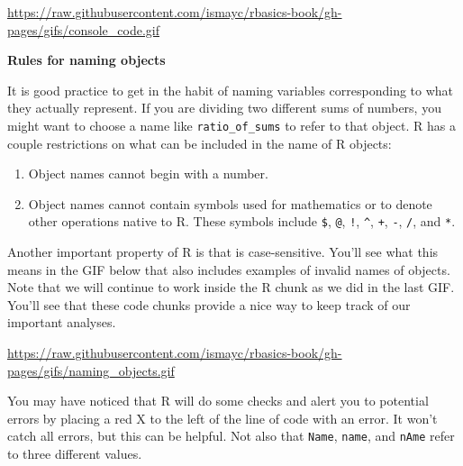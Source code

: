 \documentclass[]{tufte-book}
\providecommand{\tightlist}{%
  \setlength{\itemsep}{0pt}\setlength{\parskip}{0pt}}
\begin{document}
\vspace{0.1in}

\begin{center}\footnotesize{\url{https://raw.githubusercontent.com/ismayc/rbasics-book/gh-pages/gifs/console_code.gif}}\end{center}

\vspace{0.1in}

\vspace*{0.2in}

\noindent\textbf{Rules for naming objects}\vspace*{0.1in}

It is good practice to get in the habit of naming variables
corresponding to what they actually represent. If you are dividing two
different sums of numbers, you might want to choose a name like
\texttt{ratio\_of\_sums} to refer to that object. R has a couple
restrictions on what can be included in the name of R objects:

\begin{enumerate}
\def\labelenumi{\arabic{enumi}.}
\tightlist
\item
  Object names cannot begin with a number.
\item
  Object names cannot contain symbols used for mathematics or to denote
  other operations native to R. These symbols include \texttt{\$},
  \texttt{@}, \texttt{!}, \texttt{\^{}}, \texttt{+}, \texttt{-},
  \texttt{/}, and \texttt{*}.
\end{enumerate}

Another important property of R is that is case-sensitive. You'll see
what this means in the GIF below that also includes examples of invalid
names of objects. Note that we will continue to work inside the R chunk
as we did in the last GIF. You'll see that these code chunks provide a
nice way to keep track of our important analyses.

\vspace{0.1in}

\begin{center}\footnotesize{\url{https://raw.githubusercontent.com/ismayc/rbasics-book/gh-pages/gifs/naming_objects.gif}}\end{center}

\vspace{0.1in}

You may have noticed that R will do some checks and alert you to
potential errors by placing a red X to the left of the line of code with
an error. It won't catch all errors, but this can be helpful. Not also
that \texttt{Name}, \texttt{name}, and \texttt{nAme} refer to three
different values.
\end{document}
